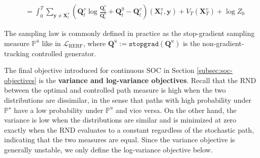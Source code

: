 \documentclass{article}
\newcommand{\boldtext}[1]{\textbf{\textcolor{MyGreen}{#1}}}
\begin{document}
\begin{definition}
\begin{small}
\begin{align}
        &=\int_0^T\sum_{\boldsymbol{y}\neq \boldsymbol{X}^v_t}\left(\boldsymbol{Q}_t^v\log \frac{\boldsymbol{Q}^v_t}{\boldsymbol{Q}^0_t}+\boldsymbol{Q}_t^0-\boldsymbol{Q}_t^v\right)(\boldsymbol{X}^v_t,\boldsymbol{y})+V_T(\boldsymbol{X}^v_T)+\log Z_0
    \end{align}
    \end{small}
    The sampling law is commonly defined in practice as the stop-gradient sampling measure $\mathbb{P}^{\bar{u}}$ like in $\mathcal{L}_{\text{RERF}}$, where $\boldsymbol{Q}^{\bar{u}}:=\texttt{stopgrad}(\boldsymbol{Q}^u)$ is the non-gradient-tracking controlled generator. 
\end{definition}

The final objective introduced for continuous SOC in Section \ref{subsec:soc-objectives} is the \boldtext{variance and log-variance objectives}. Recall that the RND between the optimal and controlled path measure is high when the two distributions are dissimilar, in the sense that paths with high probability under $\mathbb{P}^\star$ have a low probability under $\mathbb{P}^u$ and vice versa. On the other hand, the variance is low when the distributions are similar and is minimized at zero exactly when the RND evaluates to a constant regardless of the stochastic path, indicating that the two measures are equal. Since the variance objective is generally unstable, we only define the log-variance objective below.
\end{document}
